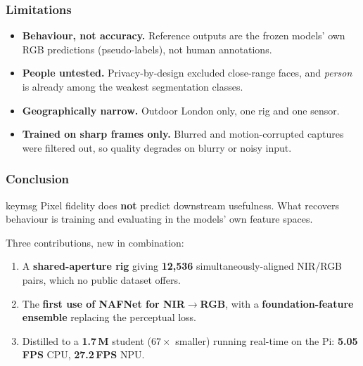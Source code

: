 \documentclass[
	aspectratio=169,
	t,
	onlytextwidth,
	10pt,
]{beamer}
\begin{document}
\begin{frame}
	\frametitle{Limitations}

	\begin{itemize}
		\item \textbf{Behaviour, not accuracy.} Reference outputs are the frozen models' own RGB predictions (pseudo-labels), not human annotations.
		\item \textbf{People untested.} Privacy-by-design excluded close-range faces, and \emph{person} is already among the weakest segmentation classes.
		\item \textbf{Geographically narrow.} Outdoor London only, one rig and one sensor.
		\item \textbf{Trained on sharp frames only.} Blurred and motion-corrupted captures were filtered out, so quality degrades on blurry or noisy input.
	\end{itemize}
\end{frame}


\begin{frame}
	\frametitle{Conclusion}

	\vspace{0.6\baselineskip}
	\begin{beamercolorbox}[wd=0.92\linewidth, sep=10pt, rounded=true]{keymsg}
		\centering Pixel fidelity does \textbf{not} predict downstream usefulness. What recovers behaviour
		is training and evaluating in the models' own feature spaces.
	\end{beamercolorbox}

	\vspace{0.6\baselineskip}
	Three contributions, new in combination:
	\begin{enumerate}
		\item A \textbf{shared-aperture rig} giving \textbf{12{,}536} simultaneously-aligned NIR/RGB pairs, which no public dataset offers.
		\item The \textbf{first use of NAFNet for NIR$\to$RGB}, with a \textbf{foundation-feature ensemble} replacing the perceptual loss.
		\item Distilled to a \textbf{1.7\,M} student ($67\times$ smaller) running real-time on the Pi: \textbf{5.05\,FPS} CPU, \textbf{27.2\,FPS} NPU.
	\end{enumerate}
\end{frame}
\end{document}
